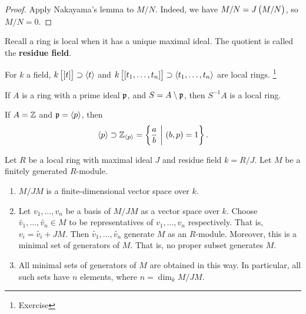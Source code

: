 \begin{proof}
Apply Nakayama's lemma to $ M / N $. Indeed, we have $ M / N = J\br{M / N} $, so $ M / N = 0 $.
\end{proof}

Recall a ring is local when it has a unique maximal ideal. The quotient is called the \textbf{residue field}.

\begin{example*}
For $ k $ a field, $ k\sbr{\sbr{t}} \supset \abr{t} $ and $ k\sbr{\sbr{t_1, \dots, t_n}} \supset \abr{t_1, \dots, t_n} $ are local rings. \footnote{Exercise}
\end{example*}

If $ A $ is a ring with a prime ideal $ \mathfrak{p} $, and $ S = A \setminus \mathfrak{p} $, then $ S^{-1}A $ is a local ring.

\begin{example*}
If $ A = \mathbb{Z} $ and $ \mathfrak{p} = \left\langle p \right\rangle $, then
$$ \abr{p} \supset \ZZ_{\abr{p}} = \cbr{\dfrac{a}{b} \st \br{b, p} = 1}. $$
\end{example*}

\begin{theorem}
Let $ R $ be a local ring with maximal ideal $ J $ and residue field $ k = R / J $. Let $ M $ be a finitely generated $ R $-module.
\begin{enumerate}
\item $ M / JM $ is a finite-dimensional vector space over $ k $.
\item Let $ v_1, \dots, v_n $ be a basis of $ M / JM $ as a vector space over $ k $. Choose $ \widetilde{v_1}, \dots, \widetilde{v_n} \in M $ to be representatives of $ v_1, \dots, v_n $ respectively. That is, $ v_i = \widetilde{v_i} + JM $. Then $ \widetilde{v_1}, \dots, \widetilde{v_n} $ generate $ M $ as an $ R $-module. Moreover, this is a minimal set of generators of $ M $. That is, no proper subset generates $ M $.
\item All minimal sets of generators of $ M $ are obtained in this way. In particular, all such sets have $ n $ elements, where $ n = \dim_k M / JM $.
\end{enumerate}
\end{theorem}

